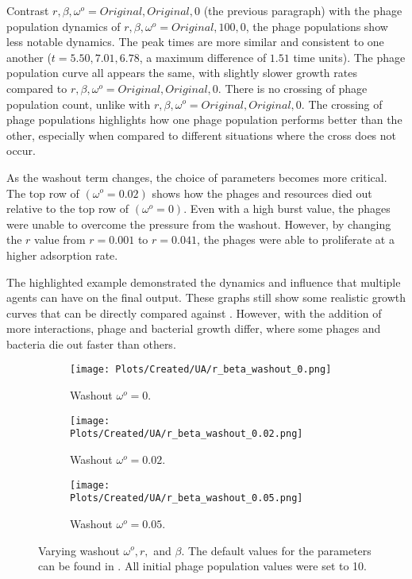 Contrast $r, \beta, \omega^o=Original, Original, 0$ (the previous paragraph) with the phage population dynamics of $r, \beta, \omega^o = Original, 100, 0$, the phage populations show less notable dynamics. 
The peak times are more similar and consistent to one another ($t=5.50, 7.01, 6.78$, a maximum difference of $1.51$ time units). 
The phage population curve all appears the same, with slightly slower growth rates compared to $r, \beta, \omega^o=Original, Original, 0$. 
There is no crossing of phage population count, unlike with $r, \beta, \omega^o=Original, Original, 0$. 
The crossing of phage populations highlights how one phage population performs better than the other, especially when compared to different situations where the cross does not occur. 

As the washout term changes, the choice of parameters becomes more critical. 
The top row of  $(\omega^o = 0.02)$ shows how the phages and resources died out relative to the top row of  $(\omega^o = 0)$. 
Even with a high burst value, the phages were unable to overcome the pressure from the washout. 
However, by changing the $r$ value from $r=0.001$ to $r=0.041$, the phages were able to proliferate at a higher adsorption rate. 

The highlighted example demonstrated the dynamics and influence that multiple agents can have on the final output. 
These graphs still show some realistic growth curves that can be directly compared against . 
However, with the addition of more interactions, phage and bacterial growth differ, where some phages and bacteria die out faster than others. 

\begin{figure}[]
    \centering
    \begin{subfigure}{0.49\linewidth}
        \centering
        \texttt{[image: Plots/Created/UA/r\_beta\_washout\_0.png]}
        \caption{
            Washout $\omega^o=0$. 
        }
        \label{fig:created:r_beta_washout_0}
    \end{subfigure}
    \hfill
    \begin{subfigure}{0.49\linewidth}
        \centering
        \texttt{[image: Plots/Created/UA/r\_beta\_washout\_0.02.png]}
        \caption{
            Washout $\omega^o=0.02$. 
        }
        \label{fig:created:r_beta_washout_0.02}
    \end{subfigure}
    \begin{subfigure}{0.49\linewidth}
        \centering
        \texttt{[image: Plots/Created/UA/r\_beta\_washout\_0.05.png]}
        \caption{
            Washout $\omega^o=0.05$. 
        }
        \label{fig:created:r_beta_washout_0.05}
    \end{subfigure}
    \caption{
        Varying washout $\omega^o, r,$ and $\beta$. 
        The default values for the parameters can be found in . 
        All initial phage population values were set to 10. 
    }
\end{figure}

